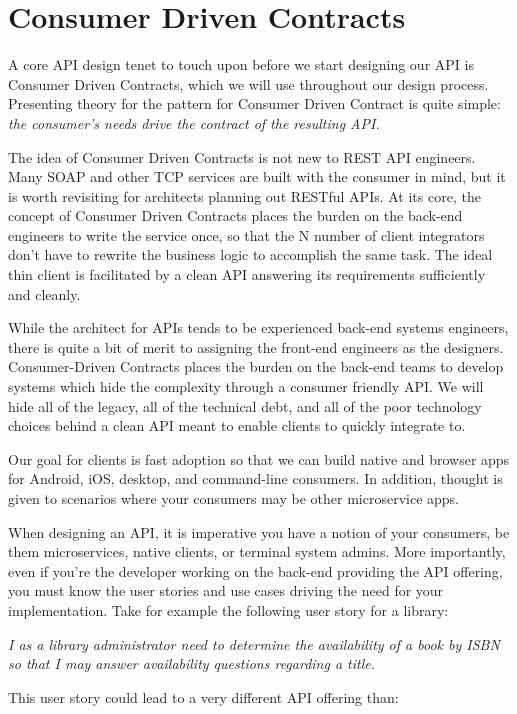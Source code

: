 \section{Consumer Driven Contracts}

A core API design tenet to touch upon before we start designing our API is Consumer Driven Contracts, which we will use throughout our design process.  Presenting theory for the pattern for Consumer Driven Contract is quite simple:  \textit{the consumer's needs drive the contract of the resulting API.}

The idea of Consumer Driven Contracts is not new to REST API engineers.  Many SOAP and other TCP services are built with the consumer in mind, but it is worth revisiting for architects planning out RESTful APIs.  At its core, the concept of Consumer Driven Contracts places the burden on the back-end engineers to write the service once, so that the N number of client integrators don't have to rewrite the business logic to accomplish the same task.  The ideal thin client is facilitated by a clean API answering its requirements sufficiently and cleanly.

While the architect for APIs tends to be experienced back-end systems engineers, there is quite a bit of merit to assigning the front-end engineers as the designers. Consumer-Driven Contracts places the burden on the back-end teams to develop systems which hide the complexity through a consumer friendly API. We will hide all of the legacy, all of the technical debt, and all of the poor technology choices behind a clean API meant to enable clients to quickly integrate to.

Our goal for clients is fast adoption so that we can build native and browser apps for Android, iOS, desktop, and command-line consumers.  In addition, thought is given to scenarios where your consumers may be other microservice apps.

When designing an API, it is imperative you have a notion of your consumers, be them microservices, native clients, or terminal system admins.  More importantly, even if you're the developer working on the back-end providing the API offering, you must know the user stories and use cases driving the need for your implementation. Take for example the following user story for a library:

\textit{I as a library administrator need to determine the availability of a book by ISBN so that I may answer availability questions regarding a title.}

This user story could lead to a very different API offering than:

